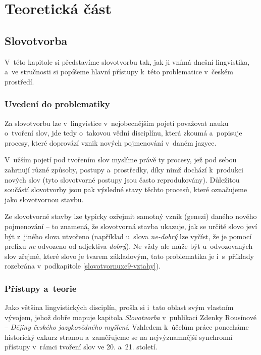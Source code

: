 \part{Teoretická část}

\hypertarget{slovotvorba}{%
\chapter{Slovotvorba}\label{slovotvorba}}

V~této kapitole si představíme slovotvorbu tak, jak ji vnímá dnešní
lingvistika, a~ve stručnosti si popíšeme hlavní přístupy k~této
problematice v~českém prostředí.

\hypertarget{uvedenuxed-do-problematiky}{%
\section{Uvedení do problematiky}\label{uvedenuxed-do-problematiky}}

Za slovotvorbu lze v~lingvistice v~nejobecnějším pojetí považovat nauku
o~tvoření slov, jde tedy o~takovou vědní disciplínu, která zkoumá
a~popisuje procesy, které doprovází vznik nových pojmenování v~daném
jazyce.

V~užším pojetí pod tvořením slov myslíme právě ty procesy, jež pod sebou
zahrnují různé způsoby, postupy a~prostředky, díky nimž dochází
k~produkci nových slov (tyto slovotvorné postupy jsou často
reprodukovány). Důležitou součástí slovotvorby jsou pak výsledné stavy
těchto procesů, které označujeme jako slovotvornou stavbu.
\parencite[92]{dokulil00}

Ze slovotvorné stavby lze typicky ozřejmit samotný vznik (genezi) daného
nového pojmenování -- to znamená, že slovotvorná stavba ukazuje, jak se
určité slovo jeví být z~jiného slova utvořeno (například u~slova
\emph{ne-dobrý} lze vyčíst, že je pomocí prefixu \emph{ne} odvozeno od
adjektiva \emph{dobrý}). Ne vždy ale může být u~odvozovaných slov
zřejmé, které slovo je tvarem základovým, tato problematika je
i~s~příklady rozebrána v~podkapitole \ref{slovotvornuxe9-vztahy}).
\parencite[92--93]{dokulil00}

\hypertarget{pux159uxedstupy-a-teorie}{%
\section{Přístupy a~teorie}\label{pux159uxedstupy-a-teorie}}

Jako většina lingvistických disciplín, prošla si i~tato oblast svým
vlastním vývojem, jehož dobře mapuje kapitola \emph{Slovotvorba}
v~publikaci Zdenky Rousínové -- \emph{Dějiny českého jazykovědného
myšlení}. Vzhledem k~účelům práce ponecháme historický exkurz stranou
a~zaměřujeme se na nejvýznamnější synchronní přístupy v~rámci tvoření slov
ve 20. a~21. století.

